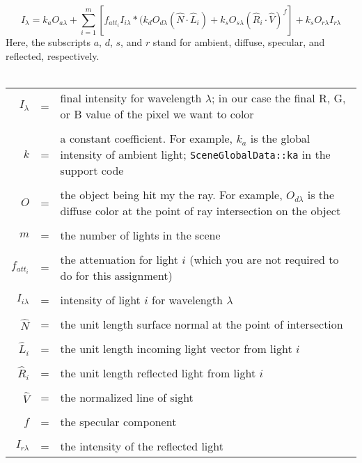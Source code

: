 \documentclass[10pt,twocolumn]{article}
\begin{document}
\[I_{\lambda} = k_aO_{a\lambda} + \sum_{i=1}^{m} \left[f_{att_i}I_{i\lambda}*(k_dO_{d\lambda}(\hat{N}\cdot\hat{L}_i) + k_sO_{s\lambda}(\hat{R}_i\cdot\hat{V})^f\right] + k_sO_{r\lambda}I_{r\lambda}\]
Here, the subscripts $a$, $d$, $s$, and $r$ stand for ambient, diffuse, specular, and reflected, respectively. \\\\
\begin{tabular}{rcp{3.3in}}
$I_{\lambda}$ & = & final intensity for wavelength $\lambda$; in our case the final R, G, or B value of the pixel we want to color\\\\
$k$ & = & a constant coefficient. For example, $k_a$ is the global intensity of ambient light; {\small{\tt SceneGlobalData::ka}} in the support code\\\\
$O$ &=& the object being hit my the ray. For example, $O_{d\lambda}$ is the diffuse color at the point of ray intersection on the object\\\\
$m$ &=& the number of lights in the scene\\\\
$f_{att_i}$ &=& the attenuation for light $i$ (which you are not required to do for this assignment) \\\\
$I_{i\lambda}$ &=& intensity of light $i$ for wavelength $\lambda$\\\\
$\hat{N}$ &=& the unit length surface normal at the point of intersection\\\\
$\hat{L}_i$ &=& the unit length incoming light vector from light $i$\\\\
$\hat{R}_i$ &=& the unit length reflected light from light $i$\\\\
$\hat{V}$ &=& the normalized line of sight\\\\
$f$ &=& the specular component\\\\
$I_{r\lambda}$ & = & the intensity of the reflected light
\end{tabular}
\end{document}
